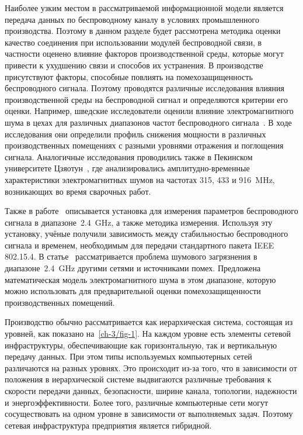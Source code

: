 Наиболее узким местом в рассматриваемой информационной модели является передача данных по беспроводному каналу в условиях промышленного производства. Поэтому в данном разделе будет рассмотрена методика оценки качество соединения при использовании модулей беспроводной связи, в частности оценено влияние факторов производственной среды, которые могут привести к ухудшению связи и способов их устранения. В производстве присутствуют факторы, способные повлиять на помехозащищенность беспроводного сигнала. Поэтому проводятся различные исследования влияния производственной среды на беспроводной сигнал и определяются критерии его оценки. Например, шведские исследователи оценили влияние электромагнитного шума в цехах для различных диапазонов частот беспроводного сигнала~\cite{6525614, 5475862}. В ходе исследования они определили профиль снижения мощности в различных производственных помещениях с разными уровнями отражения и поглощения сигнала. Аналогичные исследования проводились также в Пекинском университете Цзяотун~\cite{Li2019}, где анализировались амплитудно-временные характеристики электромагнитных шумов на частотах 315, 433 и \SI{916}{\mega\hertz}, возникающих во время сварочных работ.
	
Также в работе~\cite{Girs2013DesignOC} описывается установка для измерения параметров беспроводного сигнала в диапазоне~\SI{2,4}{\giga\hertz}, а также методика измерения. Используя эту установку, учёные получили зависимость между стабильностью беспроводного сигнала и временем, необходимым для передачи стандартного пакета IEEE 802.15.4. В статье~\cite{8308609} рассматривается проблема шумового загрязнения в диапазоне~\SI{2,4}{\giga\hertz} другими сетями и источниками помех. Предложена математическая модель электромагнитного шума в этом диапазоне, которую можно использовать для предварительной оценки помехозащищенности производственных помещений.

Производство обычно рассматривается как иерархическая система, состоящая из уровней, как показано на~\cref{ch-3/fig-1}. На каждом уровне есть элементы сетевой инфраструктуры, обеспечивающие как горизонтальную, так и вертикальную передачу данных.
При этом типы используемых компьютерных сетей различаются на разных уровнях. Это происходит из-за того, что в зависимости от положения в иерархической системе выдвигаются различные требования к скорости передачи данных, безопасности, ширине канала, топологии, надежности и энергоэффективности. Более того, различные компьютерные сети могут сосуществовать на одном уровне в зависимости от выполняемых задач. Поэтому сетевая инфраструктура предприятия является гибридной.

